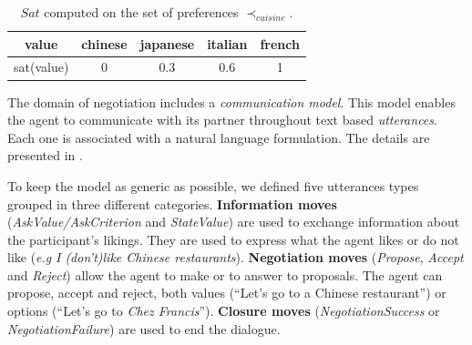 \documentclass[conference, letterpaper]{IEEEtran}
\begin{document}
	\begin{table} [h]
		\centering
		\begin{tabular}{ |c|c|c|c|c| }
		\hline
		value & chinese & japanese & italian & french \\	
		\hline
		sat(value) & 0 & 0.3 & 0.6 & 1 \\
		\hline
	\end{tabular}
		\caption{$Sat$ computed on the set of preferences $\prec_{cuisine}$.}
		\label{tab:sat}
		\vspace{-0.5em} 
	\end{table}

	
	

	
%			
%			
	
	The domain of negotiation includes a \emph{communication model}. This model enables the agent to communicate with its partner throughout text based \textit{utterances}. 
	Each one is associated with a natural language formulation. The details are presented in \cite{ouali2017computational}.
	
	To keep the model as generic as possible, we defined five utterances types grouped in three different categories. \textbf{Information moves} (\textit{AskValue/AskCriterion} and \textit{StateValue}) are used to exchange information about the participant's likings. They are used to express what the agent likes or do not like (\emph{e.g} \textit{I (don't)like Chinese restaurants}).
	\textbf{Negotiation moves} (\textit{Propose}, \textit{Accept} and \textit{Reject}) allow the agent to make or to answer to proposals. The agent can propose, accept and reject, both values (``Let's go to a Chinese restaurant'') or options (``Let's go to \emph{Chez Francis}'').	
	\textbf{Closure moves} (\textit{NegotiationSuccess} or \textit{NegotiationFailure}) are used to end the dialogue.
\end{document}
